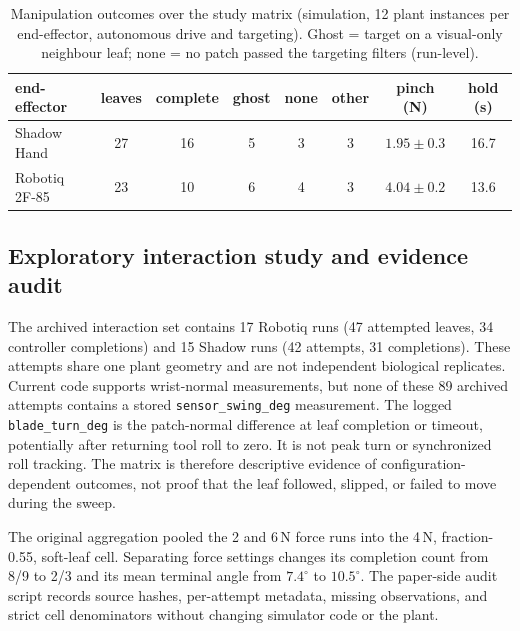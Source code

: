 \documentclass[letterpaper, 10 pt, conference]{ieeeconf}
\begin{document}
\begin{table}[t]
\caption{Manipulation outcomes over the study matrix (simulation, 12 plant instances per
end-effector, autonomous drive and targeting). Ghost = target on a visual-only neighbour
leaf; none = no patch passed the targeting filters (run-level).}
\label{tab:manip}
\centering\footnotesize
\begin{tabular}{@{}lccccccc@{}}
\toprule
end-effector & leaves & complete & ghost & none & other & pinch (N) & hold (s) \\
\midrule
Shadow Hand & 27 & 16 & 5 & 3 & 3 & $1.95{\pm}0.3$ & 16.7 \\
Robotiq 2F-85 & 23 & 10 & 6 & 4 & 3 & $4.04{\pm}0.2$ & 13.6 \\
\bottomrule
\end{tabular}
\end{table}

\subsection{Exploratory interaction study and evidence audit}\label{sec:interaction}
The archived interaction set contains 17 Robotiq runs (47 attempted leaves, 34 controller
completions) and 15 Shadow runs (42 attempts, 31 completions). These attempts share one
plant geometry and are not independent biological replicates. Current code supports
wrist-normal measurements, but none of these 89 archived attempts contains a stored
\texttt{sensor\_swing\_deg} measurement. The logged \texttt{blade\_turn\_deg} is the
patch-normal difference at leaf completion or timeout, potentially after returning tool
roll to zero. It is not peak turn or synchronized roll tracking. The matrix is therefore
descriptive evidence of configuration-dependent outcomes, not proof that the leaf
followed, slipped, or failed to move during the sweep.

The original aggregation pooled the 2 and 6\,N force runs into the 4\,N, fraction-0.55,
soft-leaf cell. Separating force settings changes its completion count from 8/9 to 2/3
and its mean terminal angle from $7.4^\circ$ to $10.5^\circ$. The paper-side audit script
records source hashes, per-attempt metadata, missing observations, and strict cell
denominators without changing simulator code or the plant.
\end{document}
